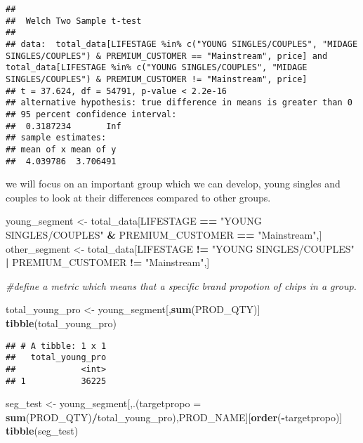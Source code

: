 \documentclass[
]{article}
\newenvironment{Shaded}{\begin{snugshade}}{\end{snugshade}}
\newcommand{\AttributeTok}[1]{\textcolor[rgb]{0.13,0.29,0.53}{#1}}
\newcommand{\CommentTok}[1]{\textcolor[rgb]{0.56,0.35,0.01}{\textit{#1}}}
\newcommand{\FunctionTok}[1]{\textcolor[rgb]{0.13,0.29,0.53}{\textbf{#1}}}
\newcommand{\NormalTok}[1]{#1}
\newcommand{\OtherTok}[1]{\textcolor[rgb]{0.56,0.35,0.01}{#1}}
\newcommand{\SpecialCharTok}[1]{\textcolor[rgb]{0.81,0.36,0.00}{\textbf{#1}}}
\newcommand{\StringTok}[1]{\textcolor[rgb]{0.31,0.60,0.02}{#1}}
\begin{document}
\begin{verbatim}
## 
##  Welch Two Sample t-test
## 
## data:  total_data[LIFESTAGE %in% c("YOUNG SINGLES/COUPLES", "MIDAGE SINGLES/COUPLES") & PREMIUM_CUSTOMER == "Mainstream", price] and total_data[LIFESTAGE %in% c("YOUNG SINGLES/COUPLES", "MIDAGE SINGLES/COUPLES") & PREMIUM_CUSTOMER != "Mainstream", price]
## t = 37.624, df = 54791, p-value < 2.2e-16
## alternative hypothesis: true difference in means is greater than 0
## 95 percent confidence interval:
##  0.3187234       Inf
## sample estimates:
## mean of x mean of y 
##  4.039786  3.706491
\end{verbatim}

we will focus on an important group which we can develop, young singles
and couples to look at their differences compared to other groups.

\begin{Shaded}
\begin{Highlighting}[]
\NormalTok{young\_segment }\OtherTok{\textless{}{-}}\NormalTok{ total\_data[LIFESTAGE }\SpecialCharTok{==} \StringTok{"YOUNG SINGLES/COUPLES"} \SpecialCharTok{\&}\NormalTok{ PREMIUM\_CUSTOMER }\SpecialCharTok{==} \StringTok{"Mainstream"}\NormalTok{,]}
\NormalTok{other\_segment }\OtherTok{\textless{}{-}}\NormalTok{ total\_data[LIFESTAGE }\SpecialCharTok{!=} \StringTok{"YOUNG SINGLES/COUPLES"} \SpecialCharTok{|}\NormalTok{ PREMIUM\_CUSTOMER }\SpecialCharTok{!=} \StringTok{"Mainstream"}\NormalTok{,]}

\CommentTok{\#define a metric which means that a specific brand propotion of chips in a group.}

\NormalTok{total\_young\_pro }\OtherTok{\textless{}{-}}\NormalTok{ young\_segment[,}\FunctionTok{sum}\NormalTok{(PROD\_QTY)]}
\FunctionTok{tibble}\NormalTok{(total\_young\_pro)}
\end{Highlighting}
\end{Shaded}

\begin{verbatim}
## # A tibble: 1 x 1
##   total_young_pro
##             <int>
## 1           36225
\end{verbatim}

\begin{Shaded}
\begin{Highlighting}[]
\NormalTok{seg\_test }\OtherTok{\textless{}{-}}\NormalTok{ young\_segment[,.(}\AttributeTok{targetpropo =} \FunctionTok{sum}\NormalTok{(PROD\_QTY)}\SpecialCharTok{/}\NormalTok{total\_young\_pro),PROD\_NAME][}\FunctionTok{order}\NormalTok{(}\SpecialCharTok{{-}}\NormalTok{targetpropo)]}
\FunctionTok{tibble}\NormalTok{(seg\_test)}
\end{Highlighting}
\end{Shaded}
\end{document}
